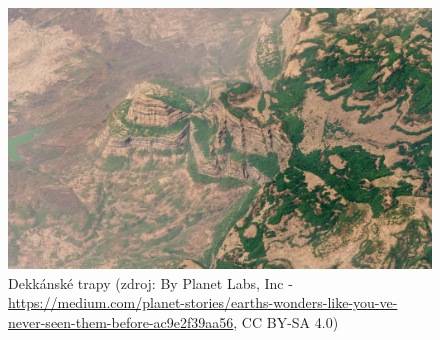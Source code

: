 \begin{figure}[h]
	\centering
	\includegraphics[width=\linewidth]{obrazky/sopky/trapy}
	\caption{Dekkánské trapy (zdroj: By Planet Labs, Inc - \url{https://medium.com/planet-stories/earths-wonders-like-you-ve-never-seen-them-before-ac9e2f39aa56}, CC BY-SA 4.0)}
	\label{fig:trapy}
\end{figure}

%		
%
%	
